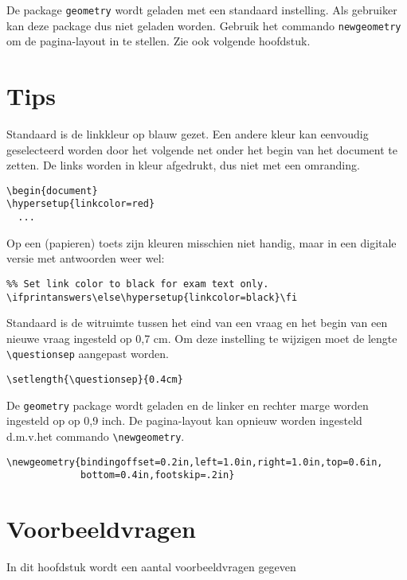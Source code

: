 \documentclass[dutch,a4paper,12pt,addpoints,fleqn,oneside]{tisdexam}
\begin{document}
\medskip
De package \verb|geometry| wordt geladen met een standaard instelling. Als
gebruiker kan deze package dus niet geladen worden. Gebruik het commando
\verb|newgeometry| om de pagina-layout in te stellen. Zie ook volgende
hoofdstuk.


\section{Tips}
Standaard is de linkkleur op blauw gezet. Een andere kleur kan eenvoudig
geselecteerd worden door het volgende net onder het begin van het document
te zetten. De links worden in kleur afgedrukt, dus niet met een omranding.

\begin{lstlisting}
\begin{document}
\hypersetup{linkcolor=red}
  ...
\end{lstlisting}

\medskip
Op een (papieren) toets zijn kleuren misschien niet handig, maar in een
digitale versie met antwoorden weer wel:

\begin{lstlisting}
%% Set link color to black for exam text only.
\ifprintanswers\else\hypersetup{linkcolor=black}\fi
\end{lstlisting}

\medskip
Standaard is de witruimte tussen het eind van een vraag en het begin van een
nieuwe vraag ingesteld op 0,7 cm. Om deze instelling te wijzigen moet de
lengte \verb|\questionsep| aangepast worden.

\begin{lstlisting}
\setlength{\questionsep}{0.4cm}
\end{lstlisting}

\medskip
De \verb|geometry| package wordt geladen en de linker en rechter marge worden
ingesteld op op 0,9 inch. De pagina-layout kan opnieuw worden ingesteld
d.m.v.\@ het commando \verb|\newgeometry|.

\begin{lstlisting}
\newgeometry{bindingoffset=0.2in,left=1.0in,right=1.0in,top=0.6in,
             bottom=0.4in,footskip=.2in}
\end{lstlisting}

\section{Voorbeeldvragen}
In dit hoofdstuk wordt een aantal voorbeeldvragen gegeven
\end{document}
